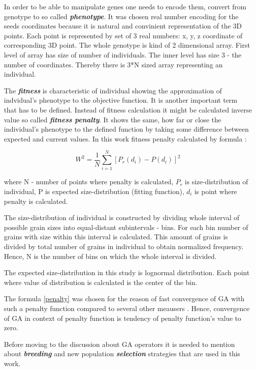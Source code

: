 \documentclass[12pt]{report}
\begin{document}
In order to be able to manipulate genes one needs to encode them, convert from genotype to so called \textit{\textbf{phenotype}}. It was chosen real number encoding for the seeds coordinates because it is natural and convinient representation of the 3D points. Each point is represented by set of 3 real numbers: x, y, z coordinate of corresponding 3D point. The whole genotype is kind of 2 dimensional array. First level of array has size of number of individuals. The inner level has size 3 - the number of coordinates. Thereby there is 3*N sized array representing an individual.

The \textit{\textbf{fitness}} is characteristic of individual showing the approximation of indvidual's phenotype to the objective function. It is another important term that has to be defined. Instead of fitness calculation it might be calculated inverse value so called \textit{\textbf{fitness penalty}}. It shows the same, how far or close the individual's phenotype to the defined function by taking some difference between expected and current values. In this work fitness penalty calculated by formula \cite{shen15}:

\begin{equation} \label{penalty}
W^2 = \frac{1}{N} \sum_{i=1}^{N} [P_r(d_i) - P(d_i)]^2
\end{equation}
\bigbreak
 
where N - number of points where penalty is calculated, $P_r$ is size-distribution of individual, P is expected size-distribution (fitting function), $d_i$ is point where penalty is calculated.

The size-distribution of individual is constructed by dividing whole interval of possible grain sizes into equal-distant subintervals - bins. For each bin number of grains with size within this interval is calculated. This amount of grains is divided by total number of grains in individual to obtain normalized frequency. Hence, N is the number of bins on which the whole interval is divided.

The expected size-distribution in this study is lognormal distribution. Each point where value of distribution is calculated is the center of the bin.

The formula \ref{penalty} was chosen for the reason of fast convergence of GA with such a penalty function compared to several other meausers \cite{shen15}. Hence, convergence of GA in context of penalty function is tendency of penalty function's value to zero.

Before moving to the discussion about GA operators it is needed to mention about \textit{\textbf{breeding}} and new population \textit{\textbf{selection}} strategies that are used in this work.
\end{document}
